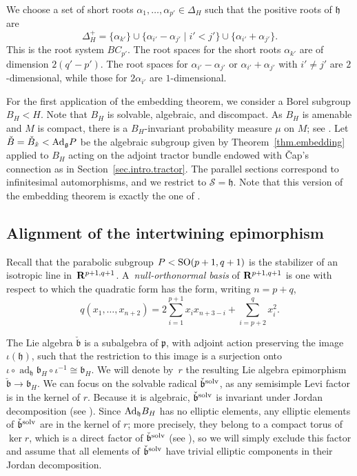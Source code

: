 \documentclass[10pt,a4paper]{amsart}
\numberwithin{equation}{section}
\theoremstyle{definition}
\newcommand{\BR}{{\bf R}}
\newcommand{\lieg}{\mathfrak{g}}
\newcommand{\lieh}{\mathfrak{h}}
\def\h{{\mathfrak h}}
\def\p{{\mathfrak p}}
\def\b{{\mathfrak b}}
\newcommand{\SO}{{\rm SO}}
\begin{document}
We choose a set of short roots $\alpha_1, \dots, \alpha_{p'} \in \Delta_H$ such that the positive roots of $\lieh$ are
\[ \Delta_H^+ = \{ \alpha_{k'} \} \cup \{ \alpha_{i'} - \alpha_{j'} \mid i' < j' \} \cup \{ \alpha_{i'} + \alpha_{j'} \} .\]
This is the root system $BC_{p'}$. The root spaces for the short roots $\alpha_{k'}$ are of dimension $2(q'-p')$. The root spaces for $\alpha_{i'} - \alpha_{j'}$ or $\alpha_{i'} + \alpha_{j'}$ with $i' \neq j'$ are $2$-dimensional, while those for $2 \alpha_{i'}$ are $1$-dimensional.

For the first application of the embedding theorem, we consider a Borel subgroup $B_H < H$. Note that $B_H$ is solvable, algebraic, and discompact. As $B_H$ is amenable and $M$ is compact, there is a $B_H$-invariant probability measure $\mu$ on $M$; see \cite[Definition~4.1.1 and Corollary~4.1.7]{zimmer.etsg}.
Let $\check{B} = \check{B}_{\hat{x}} < {\rm Ad}_\lieg P$ be the algebraic subgroup given by Theorem~\ref{thm.embedding} applied to $B_H$ acting on the adjoint tractor bundle endowed with \v{C}ap's connection as in Section~\ref{sec.intro.tractor}. The parallel sections correspond to infinitesimal automorphisms, and we restrict to $\mathcal{S} = \lieh$. Note that this version of the embedding theorem is exactly the one of \cite{bfm.zimemb}.

\subsection{Alignment of the intertwining epimorphism}
\label{subsec.alignment}

Recall that the parabolic subgroup $P < \SO(p+1,q+1)$ is the stabilizer of an isotropic line in~$\BR^{p+1,q+1}$. A~\emph{null-orthonormal basis} of $\BR^{p+1,q+1}$ is one with respect to which the quadratic form has the form, writing $n=p+q$,
\[q(x_1, \dots, x_{n+2}) = 2 \sum_{i=1}^{p+1} x_i x_{n+3-i} + \sum_{i=p+2}^{q} x_i^2.\]

The Lie algebra $\check{\b}$ is a subalgebra of $\p$, with adjoint action preserving the image $\iota(\lieh)$, such that the restriction to this image is a surjection onto $\iota \circ \operatorname{ad}_\lieh \b_H \circ \iota^{-1} \cong \b_H$.
We will denote by~$r$ the resulting Lie algebra epimorphism $\check{\b} \rightarrow \b_H$.
We can focus on the solvable radical $\check{\b}^{\rm solv}$, as any semisimple Levi factor is in the kernel of $r$. Because it is algebraic, $\check{\b}^{\rm solv}$ is invariant under Jordan decomposition (see \cite[Theorem~4.3.3]{morris.ratners.thms.book}). Since ${\rm Ad}_\h B_H$ has no elliptic elements, any elliptic elements of $\check{\b}^{\rm solv}$ are in the kernel of $r$; more precisely, they belong to a compact torus of $\ker r$, which is a direct factor of $\check{\b}^{\rm solv}$ (see \cite[Theorem~4.4.7 and Corollary 4.4.12]{morris.ratners.thms.book}), so we will simply exclude this factor and assume that all elements of $\check{\b}^{\rm solv}$ have trivial elliptic components in their Jordan decomposition.
\end{document}
